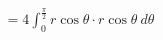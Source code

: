 \documentclass[preview]{standalone}
\begin{document}
\begin{align*}
=4\int_{0}^{\frac{\pi}{2}}r\cos\theta\cdot r\cos\theta\ d\theta
\end{align*}
\end{document}
